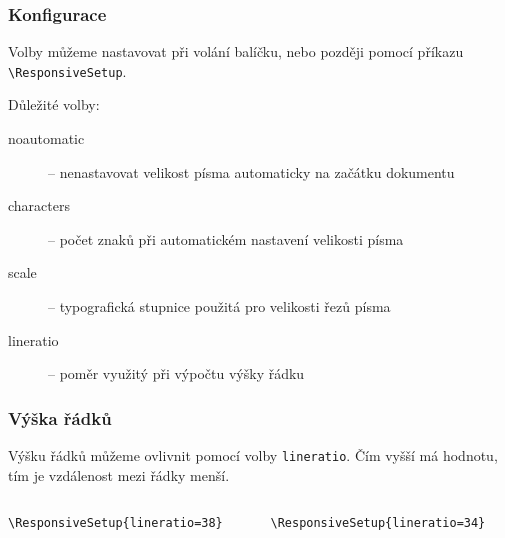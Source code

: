 \begin{frame}[fragile]
  \frametitle{Konfigurace}
  Volby můžeme nastavovat při volání balíčku, nebo později pomocí příkazu \verb|\ResponsiveSetup|.

  Důležité volby:

  \begin{description}
    \item[noautomatic] -- nenastavovat velikost písma automaticky na začátku dokumentu
    \item[characters] -- počet znaků při automatickém nastavení velikosti písma
    \item[scale] --  typografická stupnice použitá pro velikosti řezů písma
    \item[lineratio] -- poměr využitý při výpočtu výšky řádku
  \end{description}

\end{frame}

\begin{frame}[fragile]
  \frametitle{Výška řádků}
  Výšku řádků můžeme ovlivnit pomocí volby \texttt{lineratio}. 
Čím vyšší má hodnotu, tím je vzdálenost mezi řádky menší.

\begin{columns}
  \begin{column}{0.5\textwidth}
\begin{verbatim}
\ResponsiveSetup{lineratio=38}
\end{verbatim}
\end{column}
  \begin{column}{0.5\textwidth}
\begin{verbatim}
\ResponsiveSetup{lineratio=34}
\end{verbatim}
\end{column}
\end{columns}

\end{frame}

\newcommand\printsize[1]{\csname #1\endcsname\par\noindent Sample\par}
\newcommand\showscale[2][.5\textwidth]{%
      \printsize{huge}
      \printsize{LARGE}
      \printsize{Large}
      \printsize{large}
      \hrule
      \printsize{normalsize}
      \hrule
      \printsize{small}
      \printsize{footnotesize}
}



